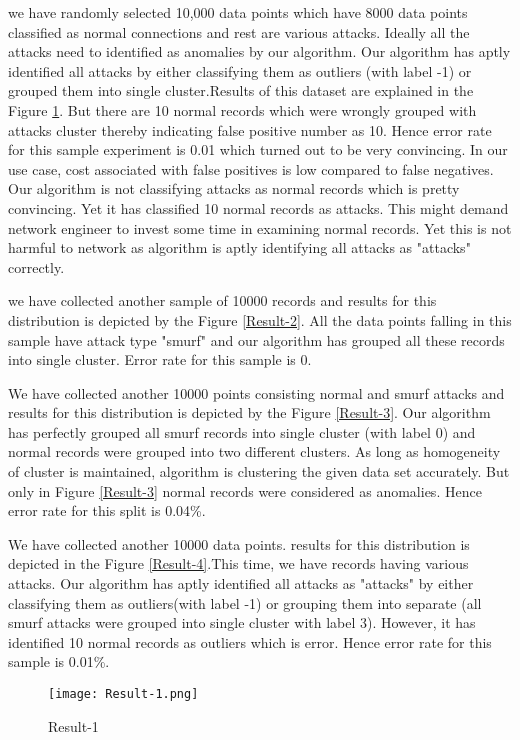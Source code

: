 \documentclass{acm_proc_article-sp}
\begin{document}
we have randomly selected 10,000 data points which have 8000 data points classified as normal connections and rest are various attacks. Ideally all the attacks need to identified as anomalies by our algorithm. Our algorithm has aptly identified all attacks by either classifying them as outliers (with label -1) or grouped them into single cluster.Results of this dataset are explained in the Figure \ref{Result-1}. But there are 10 normal records which were wrongly grouped with attacks cluster thereby indicating false positive number as 10. Hence error rate for this sample experiment is 0.01 which turned out to be very convincing. In our use case, cost associated with false positives is low compared to false negatives. Our algorithm is not classifying attacks as normal records which is pretty convincing. Yet it has classified 10 normal records as attacks. This might demand network engineer to invest some time in examining normal records. Yet this is not harmful to network as algorithm is aptly identifying all attacks as "attacks" correctly.

we have collected another sample of 10000 records and results for this distribution is depicted by the Figure \ref{Result-2}. All the data points falling in this sample have attack type "smurf" and our algorithm has grouped all these records into single cluster. Error rate for this sample is 0.

We have collected another 10000 points consisting normal and smurf attacks and results for this distribution is depicted by the Figure \ref{Result-3}. Our algorithm has perfectly grouped all smurf records into single cluster (with label 0) and normal records were grouped into two different clusters. As long as homogeneity of cluster is maintained, algorithm is clustering the given data set accurately. But only in Figure \ref{Result-3} normal records were considered as anomalies. Hence error rate for this split is 0.04\%.

We have collected another 10000 data points. results for this distribution is depicted in the Figure \ref{Result-4}.This time, we have records having various attacks. Our algorithm has aptly identified all attacks as "attacks" by either classifying them as outliers(with label -1) or grouping them into separate (all smurf attacks were grouped into single cluster with label 3). However, it has identified 10 normal records as outliers which is error. Hence error rate for this sample is 0.01\%.
\begin{figure}[h]
\texttt{[image: Result-1.png]}
\centering
\caption{Result-1}
\label{Result-1}
\end{figure}
\end{document}
